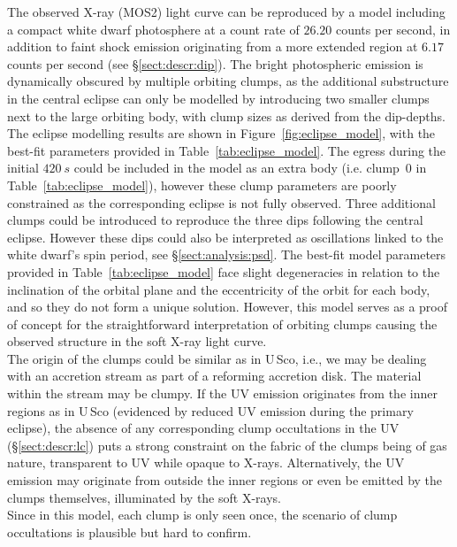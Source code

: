 \documentclass{aa}
\begin{document}
The observed X-ray (MOS2) light curve can be reproduced by a model including a
compact white dwarf photosphere at a count rate of $26.20$ counts per
second, in addition
to faint shock emission originating from a more extended region at
$6.17$\,counts per second (see \S\ref{sect:descr:dip}). The bright
photospheric emission
is dynamically obscured by multiple orbiting clumps, as the additional
substructure in the central eclipse can only be modelled by introducing
two smaller clumps next to the large orbiting body, with clump sizes as
derived from the dip-depths. The eclipse modelling results are shown in
Figure~\ref{fig:eclipse_model}, with the best-fit parameters provided in
Table~\ref{tab:eclipse_model}. The egress during the initial $420~s$
could be included in the model as an extra body (i.e. clump~0 in
Table~\ref{tab:eclipse_model}), however these clump parameters are
poorly constrained as the corresponding eclipse is not fully observed.
Three additional clumps could be introduced to reproduce the three dips
following the central eclipse. However these dips could also be
interpreted as oscillations linked to the white dwarf's spin period,
see \S\ref{sect:analysis:psd}. The best-fit model parameters provided
in Table~\ref{tab:eclipse_model} face slight degeneracies in relation
to the inclination of the orbital plane and the eccentricity of the
orbit for each body, and so they do not form a unique solution.
However, this model serves as a proof of concept for the
straightforward interpretation of orbiting clumps causing the observed
structure in the soft X-ray light curve.\\

The origin of the clumps could be similar as in U\,Sco, i.e., we may
be dealing with an accretion stream as part of a reforming accretion
disk. The material within the stream may be clumpy. If the UV emission
originates from the inner regions as in U\,Sco (evidenced by reduced
UV emission during the primary eclipse), the absence of any corresponding
clump occultations in the UV (\S\ref{sect:descr:lc}) puts a strong
constraint on the fabric of the clumps being of gas nature, transparent
to UV while opaque to X-rays. Alternatively, the UV emission may originate
from outside the inner regions or even be emitted by the clumps themselves,
illuminated by the soft X-rays.\\

Since in this model, each clump is only seen once, the scenario of
clump occultations is plausible but hard to confirm.
\end{document}
